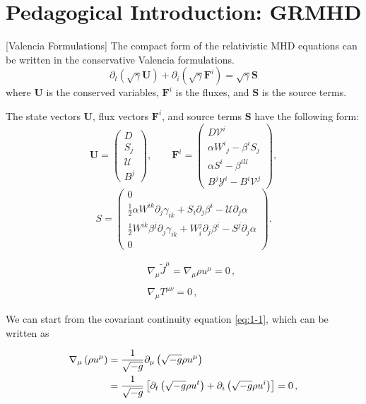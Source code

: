 \documentclass{article}
\begin{document}
\section{Pedagogical Introduction: GRMHD}
[Valencia Formulations] The compact form of the relativistic MHD equations can be written in the conservative Valencia formulations.
\begin{equation}
    \partial_t(\sqrt{\gamma} \boldsymbol{U})+\partial_i\left(\sqrt{\gamma} \boldsymbol{F}^i\right)=\sqrt{\gamma} \boldsymbol{S}
\end{equation}
where $\boldsymbol{U}$ is the conserved variables, $\boldsymbol{F}^i$ is the fluxes, and $\boldsymbol{S}$ is the source terms.

The state vectors $\boldsymbol{U}$, flux vectors $\boldsymbol{F}^i$, and source terms $\boldsymbol{S}$ have the following form:
\begin{equation}
    \boldsymbol{U}=\left(\begin{array}{c}
    D \\
    S_j \\
    \mathscr{U} \\
    B^j
    \end{array}\right), \quad \quad \boldsymbol{F}^i=\left(\begin{array}{c}
    D \mathscr{V}^i \\
    \alpha W^i{ }_j-\beta^i S_j \\
    \alpha S^i-\beta^{i \mathscr{U}} \\
    B^j \mathscr{Y}^i-B^i \mathscr{V}^j
    \end{array}\right),
\end{equation}
\begin{equation}
    S=\left(\begin{array}{c}
    0 \\
    \frac{1}{2} \alpha W^{i k} \partial_j \gamma_{i k}+S_i \partial_j \beta^i-\mathscr{U} \partial_j \alpha \\
    \frac{1}{2} W^{i k} \beta^j \partial_j \gamma_{i k}+W_i^j \partial_j \beta^i-S^j \partial_j \alpha \\
    0
    \end{array}\right) .
\end{equation}

\begin{eqnarray}
  \label{eq:1-1}
  &&\nabla_\mu \tilde{J}^\mu = \nabla_\mu \rho u^\mu = 0\,,\\
  \nonumber \\
  \label{eq:1-2}
  &&\nabla_\mu T^{\mu \nu} = 0\,,
\end{eqnarray}

We can start from the covariant continuity equation \eqref{eq:1-1}, which
can be written as

\begin{align}
\nabla_\mu \left(\rho u^\mu\right) &= \frac{1}{\sqrt{-g}} \partial_\mu
\left(\sqrt{-g} \rho u^\mu\right) \notag \\ &= \frac{1}{\sqrt{-g}}
\left[\partial_t \left(\sqrt{-g} \rho u^t\right) + \partial_i
  \left(\sqrt{-g} \rho u^i\right)\right] = 0\,, \label{eq:continuity}
\end{align}




\end{document}
